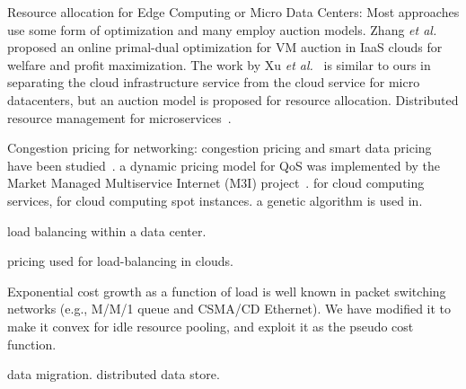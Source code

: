 
Resource allocation for Edge Computing or Micro Data Centers:
Most approaches use some form of optimization and many employ auction
models.
Zhang {\em et al.}~\cite{Xu2017-zenith,Zhang2017-VMauction}
proposed an online primal-dual optimization for VM auction in IaaS
clouds for welfare and profit maximization.
The work by Xu {\em et al.}~\cite{Xu2017-zenith} is similar to ours in
separating the cloud infrastructure service from the cloud service for
micro datacenters, but an auction model is proposed for resource
allocation.
Distributed resource management for microservices~\cite{Suresh-SOA-SOCC2017}.

Congestion pricing for networking:
congestion pricing and smart data pricing have been
studied~\cite{pricing-internet-1994,gibbens1999resource,Henderson2001,Sen-2013}.
a dynamic pricing model for QoS was implemented by the
Market Managed Multiservice Internet (M3I) project~\cite{Briscoe2003-M3I}.
for cloud computing services\cite{Wang-hotcloud2010,Kilcioglu-SIGMETRICS2015},
for cloud computing spot instances\cite{Song-INFOCOM2017}.
a genetic algorithm is used in\cite{Macias-SAC2011}.

load balancing within a data center\cite{Rikhtegar2021BiTEAD}.

pricing used for load-balancing in clouds\cite{Song-2014,Ren-2017}.

Exponential cost growth as a function of load is well known in packet
switching networks (e.g., M/M/1 queue and CSMA/CD Ethernet).
We have modified it to make it convex for idle resource pooling, and
exploit it as the pseudo cost function.

data migration\cite{Pu2015-geodistdata}.
distributed data store\cite{Shima2012,Tahoe-2008}.


